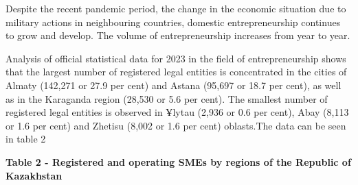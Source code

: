 Despite the recent pandemic period, the change in the economic situation
due to military actions in neighbouring countries, domestic
entrepreneurship continues to grow and develop. The volume of
entrepreneurship increases from year to year.

Analysis of official statistical data for 2023 in the field of
entrepreneurship shows that the largest number of registered legal
entities is concentrated in the cities of Almaty (142,271 or 27.9 per
cent) and Astana (95,697 or 18.7 per cent), as well as in the Karaganda
region (28,530 or 5.6 per cent). The smallest number of registered legal
entities is observed in Ұlytau (2,936 or 0.6 per cent), Abay (8,113 or
1.6 per cent) and Zhetisu (8,002 or 1.6 per cent) oblasts.The data can
be seen in table 2

{\bfseries Table 2 - Registered and operating SMEs by regions of the
Republic of Kazakhstan}

